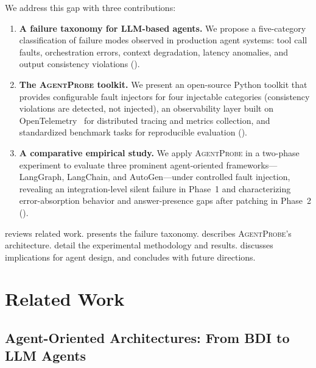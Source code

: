 \documentclass[make,article,submit,moreauthors,pdftex]{mdpi}
\providecommand{\agentprobe}{\textsc{AgentProbe}}
\begin{document}
We address this gap with three contributions:

\begin{enumerate}
  \item \textbf{A failure taxonomy for LLM-based agents.} We propose a five-category classification of failure modes observed in production agent systems: tool call faults, orchestration errors, context degradation, latency anomalies, and output consistency violations ().

  \item \textbf{The \agentprobe{} toolkit.} We present an open-source Python toolkit that provides configurable fault injectors for four injectable categories (consistency violations are detected, not injected), an observability layer built on OpenTelemetry~\cite{opentelemetry2024} for distributed tracing and metrics collection, and standardized benchmark tasks for reproducible evaluation ().

  \item \textbf{A comparative empirical study.} We apply \agentprobe{} in a two-phase experiment to evaluate three prominent agent-oriented frameworks---LangGraph, LangChain, and AutoGen---under controlled fault injection, revealing an integration-level silent failure in Phase~1 and characterizing error-absorption behavior and answer-presence gaps after patching in Phase~2 ().
\end{enumerate}

 reviews related work.  presents the failure taxonomy.  describes \agentprobe{}'s architecture.  detail the experimental methodology and results.  discusses implications for agent design, and  concludes with future directions.


\section{Related Work}\label{sec:related}

\subsection{Agent-Oriented Architectures: From BDI to LLM Agents}
\end{document}
